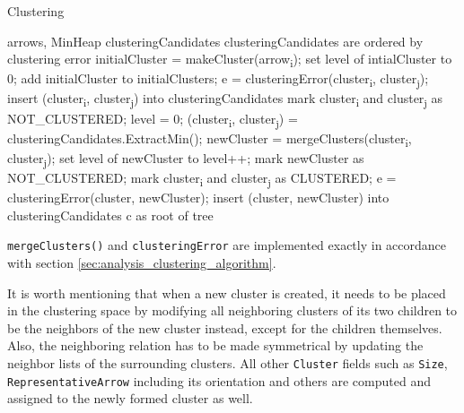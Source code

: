 \begin{algorithm}[H]
\caption{Clustering}
\begin{algorithmic}[1]

\Require arrows, MinHeap clusteringCandidates \Comment clusteringCandidates are ordered by clustering error
\Statex
{}
	\State initialCluster = makeCluster(arrow\textsubscript{i});
    \State set level of intialCluster to 0;
    \State add initialCluster to initialClusters;
\EndFor
\Statex
{}
    	\State e = clusteringError(cluster\textsubscript{i}, cluster\textsubscript{j});
        \State insert (cluster\textsubscript{i}, cluster\textsubscript{j}) into clusteringCandidates
        \State mark cluster\textsubscript{i} and cluster\textsubscript{j} as NOT\_CLUSTERED;
    \EndFor
\EndFor
\Statex
\State level = 0;
	\State (cluster\textsubscript{i}, cluster\textsubscript{j}) = clusteringCandidates.ExtractMin();
    	\State newCluster = mergeClusters(cluster\textsubscript{i}, cluster\textsubscript{j});
        \State set level of newCluster to level++;
		\State mark newCluster as NOT\_CLUSTERED;
        \State mark cluster\textsubscript{i} and cluster\textsubscript{j} as CLUSTERED;
        	\State e = clusteringError(cluster, newCluster);
            \State insert (cluster, newCluster) into clusteringCandidates
        \EndFor
    \EndIf
\EndWhile
\Statex
\Return c as root of tree
\end{algorithmic}
\end{algorithm}

\verb+mergeClusters()+ and \verb+clusteringError+ are implemented exactly in accordance with section \ref{sec:analysis_clustering_algorithm}.

It is worth mentioning that when a new cluster is created, it needs to be placed in the clustering space by modifying all neighboring clusters of its two children to be the neighbors of the new cluster instead, except for the children themselves. Also, the neighboring relation has to be made symmetrical by updating the neighbor lists of the surrounding clusters. All other \verb+Cluster+ fields such as \verb+Size+, \verb+RepresentativeArrow+ including its orientation and others are computed and assigned to the newly formed cluster as well.

